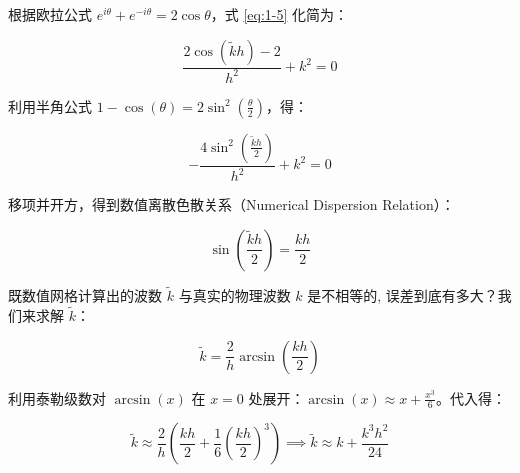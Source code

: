 \documentclass[12pt]{article}
\begin{document}
根据欧拉公式 $e^{i\theta} + e^{-i\theta} = 2\cos\theta$，式 \eqref{eq:1-5} 化简为：

\begin{equation}
\frac{2\cos(\tilde{k}h) - 2}{h^2} + k^2 = 0
\label{eq:1-5-cos}
\end{equation}

利用半角公式 $1 - \cos(\theta) = 2\sin^2\left(\frac{\theta}{2}\right)$，得：

\begin{equation}
-\frac{4 \sin^2\left(\frac{\tilde{k}h}{2}\right)}{h^2} + k^2 = 0
\label{eq:1-5-sin}
\end{equation}

移项并开方，得到数值离散色散关系（Numerical Dispersion Relation）：

\begin{equation}
\sin\left(\frac{\tilde{k}h}{2}\right) = \frac{k h}{2}
\label{eq:1-6}
\end{equation}

既数值网格计算出的波数 $\tilde{k}$ 与真实的物理波数 $k$ 是不相等的,
误差到底有多大？我们来求解 $\tilde{k}$：

\begin{equation}
\tilde{k} = \frac{2}{h} \arcsin\left(\frac{k h}{2}\right)
\label{eq:1-6-inv}
\end{equation}

利用泰勒级数对 $\arcsin(x)$ 在 $x=0$ 处展开：$\arcsin(x) \approx x + \frac{x^3}{6}$。代入得：

\begin{equation}
\tilde{k} \approx \frac{2}{h} \left( \frac{kh}{2} + \frac{1}{6} \left(\frac{kh}{2}\right)^3 \right)
\implies
\tilde{k} \approx k + \frac{k^3 h^2}{24}
\label{eq:1-7}
\end{equation}
\end{document}
